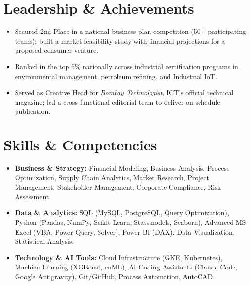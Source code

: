 \documentclass[letterpaper,11pt]{article}
\newcommand{\resumeItem}[1]{
  \item\small{#1}
}
\newcommand{\resumeItemListStart}{\begin{itemize}[leftmargin=0.2in, itemsep=2pt, topsep=1pt]}
\newcommand{\resumeItemListEnd}{\end{itemize}\vspace{2pt}}
\begin{document}
\section{Leadership \& Achievements}
\vspace{1pt}
\resumeItemListStart
  \resumeItem{Secured 2nd Place in a national business plan competition (50+ participating teams); built a market feasibility study with financial projections for a proposed consumer venture.}
  \resumeItem{Ranked in the top 5\% nationally across industrial certification programs in environmental management, petroleum refining, and Industrial IoT.}
  \resumeItem{Served as Creative Head for \textit{Bombay Technologist}, ICT's official technical magazine; led a cross-functional editorial team to deliver on-schedule publication.}
\resumeItemListEnd
\vspace{-5pt}


\section{Skills \& Competencies}
\vspace{1pt}
\begin{itemize}[leftmargin=0.15in, label={}, itemsep=1pt, parsep=0pt]

  \small \item \textbf{Business \& Strategy:} Financial Modeling, Business Analysis, Process Optimization, Supply Chain Analytics, Market Research, Project Management, Stakeholder Management, Corporate Compliance, Risk Assessment.

  \small \item \textbf{Data \& Analytics:} SQL (MySQL, PostgreSQL, Query Optimization), Python (Pandas, NumPy, Scikit-Learn, Statsmodels, Seaborn), Advanced MS Excel (VBA, Power Query, Solver), Power BI (DAX), Data Visualization, Statistical Analysis.

  \small \item \textbf{Technology \& AI Tools:} Cloud Infrastructure (GKE, Kubernetes), Machine Learning (XGBoost, cuML), AI Coding Assistants (Claude Code, Google Antigravity), Git/GitHub, Process Automation, AutoCAD.

\end{itemize}


\end{document}
